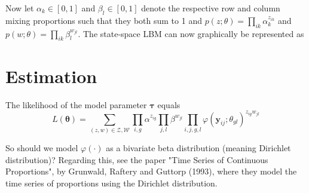 \documentclass[10pt,a4paper]{article}
\begin{document}
Now let $\alpha_k \in [0,1]$ and $\beta_l \in [0,1]$ denote the respective row and column mixing proportions such that they both sum to 1 and 
%
$
p(z; \theta) = \prod_{ik} \alpha_k^{z_{ik}} 
$
%
and 
%
$
p(w; \theta) = \prod_{ik} \beta_l^{w_{jl}}. 
$ 
%
The state-space LBM can now graphically be represented as

\begin{figure}[H]
	\centering
\end{figure}	


\section{Estimation}

The likelihood of the model parameter $\boldsymbol{\tau}$ equals
$$
L(\boldsymbol{\theta}) = \sum_{(z, w) \in \mathcal{Z}, \mathcal{W}} \prod_{i, g} \alpha^{z_{ig}} \prod_{j, l} \beta^{w_{jl}} \prod_{i, j, g, l} \varphi(\mathbf{y}_{ij}; \theta_{gl})^{z_{ig} w_{jl}}
$$

So should we model $\varphi(\cdot)$ as a bivariate beta distribution (meaning Dirichlet distribution)? Regarding this, see the paper "Time Series of Continuous Proportions", by Grunwald, Raftery and Guttorp (1993), where they model the time series of proportions using the Dirichlet distribution.
\end{document}
